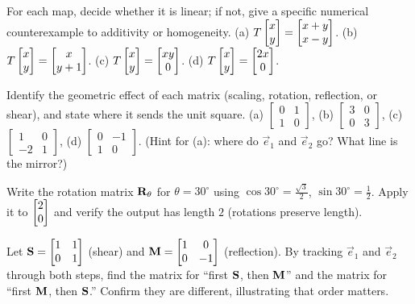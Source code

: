 \begin{exercise}
\label{ch05:ex-linornot}
For each map, decide whether it is linear; if not, give a specific numerical
counterexample to additivity or homogeneity.
(a) $T\begin{bmatrix}x\\y\end{bmatrix} = \begin{bmatrix}x+y\\x-y\end{bmatrix}$.
(b) $T\begin{bmatrix}x\\y\end{bmatrix} = \begin{bmatrix}x\\y+1\end{bmatrix}$.
(c) $T\begin{bmatrix}x\\y\end{bmatrix} = \begin{bmatrix}xy\\0\end{bmatrix}$.
(d) $T\begin{bmatrix}x\\y\end{bmatrix} = \begin{bmatrix}2x\\0\end{bmatrix}$.
\end{exercise}

\begin{exercise}
\label{ch05:ex-name}
Identify the geometric effect of each matrix (scaling, rotation, reflection, or
shear), and state where it sends the unit square.
(a) $\begin{bmatrix} 0 & 1 \\ 1 & 0\end{bmatrix}$,
(b) $\begin{bmatrix} 3 & 0 \\ 0 & 3\end{bmatrix}$,
(c) $\begin{bmatrix} 1 & 0 \\ -2 & 1\end{bmatrix}$,
(d) $\begin{bmatrix} 0 & -1 \\ 1 & 0\end{bmatrix}$.
(Hint for (a): where do $\vec{e}_1$ and $\vec{e}_2$ go? What line is the mirror?)
\end{exercise}

\begin{exercise}
\label{ch05:ex-rotation}
Write the rotation matrix $\mathbf{R}_{\theta}$ for $\theta = 30^\circ$ using
$\cos 30^\circ = \tfrac{\sqrt 3}{2}$, $\sin 30^\circ = \tfrac12$. Apply it to
$\begin{bmatrix}2\\0\end{bmatrix}$ and verify the output has length $2$ (rotations preserve length).
\end{exercise}

\begin{exercise}
\label{ch05:ex-compose}
Let $\mathbf{S} = \begin{bmatrix} 1 & 1 \\ 0 & 1\end{bmatrix}$ (shear) and
$\mathbf{M} = \begin{bmatrix} 1 & 0 \\ 0 & -1\end{bmatrix}$ (reflection). By tracking
$\vec{e}_1$ and $\vec{e}_2$ through both steps, find the matrix for ``first
$\mathbf{S}$, then $\mathbf{M}$'' and the matrix for ``first $\mathbf{M}$, then $\mathbf{S}$.''
Confirm they are different, illustrating that order matters.
\end{exercise}

